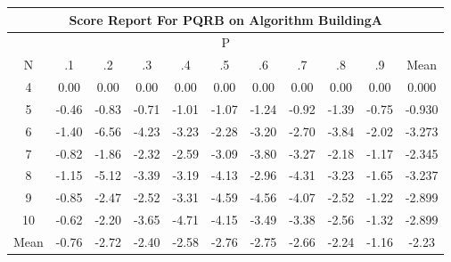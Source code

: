 \documentclass[11pt,a4paper]{report}
\begin{document}
\begin{longtable}{ | c || c | c | c | c | c | c | c | c | c || c |}
\hline
\multicolumn{11}{|c|}{ Score Report For PQRB on Algorithm BuildingA} \\
\hline
\multicolumn{11}{|c|}{ P } \\
\hline
N & .1 & .2 & .3 & .4 & .5 & .6 & .7 & .8 & .9 & Mean\\
 \hline
 \hline
 \endhead
  4 &  \cellcolor[HTML]{FFFFFF} 0.00 &  \cellcolor[HTML]{FFFFFF} 0.00 &  \cellcolor[HTML]{FFFFFF} 0.00 &  \cellcolor[HTML]{FFFFFF} 0.00 &  \cellcolor[HTML]{FFFFFF} 0.00 &  \cellcolor[HTML]{FFFFFF} 0.00 &  \cellcolor[HTML]{FFFFFF} 0.00 &  \cellcolor[HTML]{FFFFFF} 0.00 &  \cellcolor[HTML]{FFFFFF} 0.00 & 0.000 \\
  5 &  \cellcolor[HTML]{FFF7F7} -0.46 &  \cellcolor[HTML]{FFE7E7} -0.83 &  \cellcolor[HTML]{FFEFEF} -0.71 &  \cellcolor[HTML]{FFE7E7} -1.01 &  \cellcolor[HTML]{FFE7E7} -1.07 &  \cellcolor[HTML]{FFDFDF} -1.24 &  \cellcolor[HTML]{FFE7E7} -0.92 &  \cellcolor[HTML]{FFDFDF} -1.39 &  \cellcolor[HTML]{FFEFEF} -0.75 & -0.930 \\
  6 &  \cellcolor[HTML]{FFDFDF} -1.40 &  \cellcolor[HTML]{FF5858} -6.56 &  \cellcolor[HTML]{FF9797} -4.23 &  \cellcolor[HTML]{FFAFAF} -3.23 &  \cellcolor[HTML]{FFC7C7} -2.28 &  \cellcolor[HTML]{FFAFAF} -3.20 &  \cellcolor[HTML]{FFB7B7} -2.70 &  \cellcolor[HTML]{FF9F9F} -3.84 &  \cellcolor[HTML]{FFCFCF} -2.02 & -3.273 \\
  7 &  \cellcolor[HTML]{FFE7E7} -0.82 &  \cellcolor[HTML]{FFCFCF} -1.86 &  \cellcolor[HTML]{FFC7C7} -2.32 &  \cellcolor[HTML]{FFBFBF} -2.59 &  \cellcolor[HTML]{FFAFAF} -3.09 &  \cellcolor[HTML]{FF9F9F} -3.80 &  \cellcolor[HTML]{FFAFAF} -3.27 &  \cellcolor[HTML]{FFC7C7} -2.18 &  \cellcolor[HTML]{FFDFDF} -1.17 & -2.345 \\
  8 &  \cellcolor[HTML]{FFDFDF} -1.15 &  \cellcolor[HTML]{FF8080} -5.12 &  \cellcolor[HTML]{FFA7A7} -3.39 &  \cellcolor[HTML]{FFAFAF} -3.19 &  \cellcolor[HTML]{FF9797} -4.13 &  \cellcolor[HTML]{FFB7B7} -2.96 &  \cellcolor[HTML]{FF8F8F} -4.31 &  \cellcolor[HTML]{FFAFAF} -3.23 &  \cellcolor[HTML]{FFD7D7} -1.65 & -3.237 \\
  9 &  \cellcolor[HTML]{FFE7E7} -0.85 &  \cellcolor[HTML]{FFBFBF} -2.47 &  \cellcolor[HTML]{FFBFBF} -2.52 &  \cellcolor[HTML]{FFAFAF} -3.31 &  \cellcolor[HTML]{FF8F8F} -4.59 &  \cellcolor[HTML]{FF8F8F} -4.56 &  \cellcolor[HTML]{FF9797} -4.07 &  \cellcolor[HTML]{FFBFBF} -2.52 &  \cellcolor[HTML]{FFDFDF} -1.22 & -2.899 \\
  10 &  \cellcolor[HTML]{FFEFEF} -0.62 &  \cellcolor[HTML]{FFC7C7} -2.20 &  \cellcolor[HTML]{FFA7A7} -3.65 &  \cellcolor[HTML]{FF8787} -4.71 &  \cellcolor[HTML]{FF9797} -4.15 &  \cellcolor[HTML]{FFA7A7} -3.49 &  \cellcolor[HTML]{FFA7A7} -3.38 &  \cellcolor[HTML]{FFBFBF} -2.56 &  \cellcolor[HTML]{FFDFDF} -1.32 & -2.899 \\
 \hline
 \hline
Mean &  \cellcolor[HTML]{FFEFEF} -0.76 &  \cellcolor[HTML]{FFB7B7} -2.72 &  \cellcolor[HTML]{FFBFBF} -2.40 &  \cellcolor[HTML]{FFBFBF} -2.58 &  \cellcolor[HTML]{FFB7B7} -2.76 &  \cellcolor[HTML]{FFB7B7} -2.75 &  \cellcolor[HTML]{FFBFBF} -2.66 &  \cellcolor[HTML]{FFC7C7} -2.24 &  \cellcolor[HTML]{FFDFDF} -1.16 &  \cellcolor[HTML]{FFC7C7} -2.23
\end{longtable}
\end{document}
